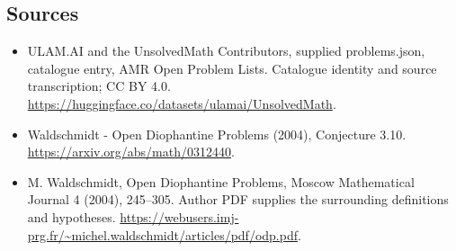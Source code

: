 \documentclass[11pt,a4paper]{article}
\begin{document}
\subsection{Sources}
\begin{itemize}
\item[S1] ULAM.AI and the UnsolvedMath Contributors, supplied problems.json, catalogue entry, AMR Open Problem Lists. Catalogue identity and source transcription; CC BY 4.0.
\url{https://huggingface.co/datasets/ulamai/UnsolvedMath}.
\item[S2] Waldschmidt - Open Diophantine Problems (2004), Conjecture 3.10. 
\url{https://arxiv.org/abs/math/0312440}.
\item[S3] M. Waldschmidt, Open Diophantine Problems, Moscow Mathematical Journal 4 (2004), 245–305. Author PDF supplies the surrounding definitions and hypotheses.
\url{https://webusers.imj-prg.fr/~michel.waldschmidt/articles/pdf/odp.pdf}.
\end{itemize}
\end{document}
